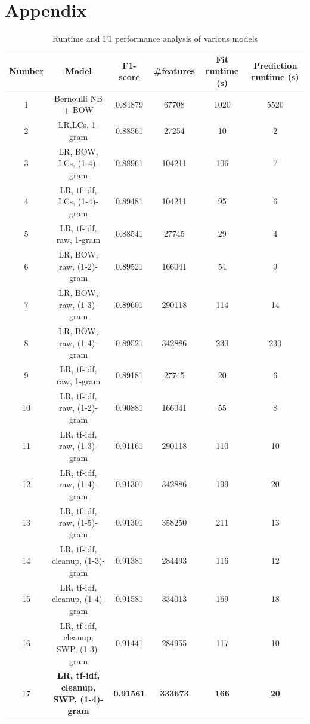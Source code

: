 \documentclass{amsart}
\theoremstyle{definition}
\theoremstyle{remark}
\numberwithin{equation}{section}
\begin{document}
\section{Appendix}
\begin{center}
	\begin{table}
		\caption{Runtime and F1 performance analysis of various models} \label{tab:title}
		\begin{tabular}{|| c | c | c | c | c | c ||}
			\hline
			Number & Model & F1-score & \#features & Fit runtime (s) & Prediction runtime (s) \\
			\hline\hline
			1 & Bernoulli NB + BOW & 0.84879 & 67708 & 1020 & 5520 \\
			\hline
			2 & LR,LCs, 1-gram & 0.88561 & 27254 & 10 & 2 \\
			\hline
			3 & LR, BOW, LCs, (1-4)-gram &  0.88961 & 104211 & 106 & 7 \\
			\hline
			4 & LR, tf-idf, LCs, (1-4)-gram & 0.89481 & 104211 & 95 & 6 \\
			\hline
			5 & LR, tf-idf, raw, 1-gram & 0.88541 & 27745 & 29 & 4 \\
			\hline
			6 & LR, BOW, raw, (1-2)-gram & 0.89521 & 166041 & 54 & 9 \\
			\hline
			7 & LR, BOW, raw, (1-3)-gram & 0.89601 & 290118 & 114 & 14 \\
			\hline
			8 & LR, BOW, raw, (1-4)-gram & 0.89521 & 342886 & 230 & 230 \\
			\hline
			9 & LR, tf-idf, raw, 1-gram & 0.89181 & 27745 & 20 & 6 \\
			\hline
			10 & LR, tf-idf, raw, (1-2)-gram & 0.90881 & 166041 & 55 & 8 \\
			\hline
			11 & LR, tf-idf, raw, (1-3)-gram & 0.91161 & 290118 & 110 & 10 \\
			\hline
			12 & LR, tf-idf, raw, (1-4)-gram & 0.91301 & 342886 & 199 & 20 \\
			\hline
			13 & LR, tf-idf, raw, (1-5)-gram & 0.91301 & 358250 & 211 & 13 \\
			\hline
			14 & LR, tf-idf, cleanup, (1-3)-gram & 0.91381 & 284493 & 116 & 12 \\
			\hline
			15 & LR, tf-idf, cleanup, (1-4)-gram & 0.91581 & 334013 & 169 & 18\\
			\hline
			16 & LR, tf-idf, cleanup, SWP, (1-3)-gram & 0.91441 & 284955 & 117 & 10 \\
			\hline
			17 & \textbf{LR, tf-idf, cleanup, SWP, (1-4)-gram} & \textbf{0.91561} & \textbf{333673} & \textbf{166} & \textbf{20} \\

\end{tabular}
\end{table}
\end{center}
\end{document}
